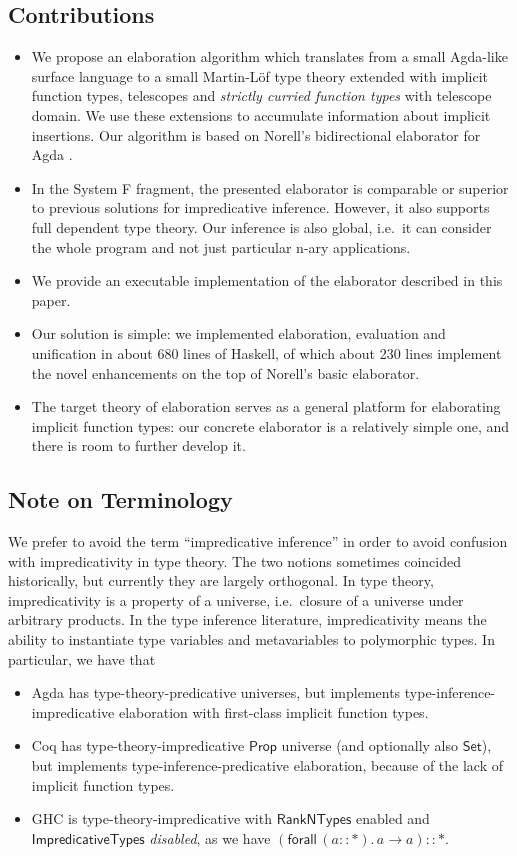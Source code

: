 \documentclass[acmsmall,screen,dvipsnames]{acmart}\settopmatter{}
\newcommand{\kw}[1]{{\mathsf{#1}}}
\theoremstyle{remark}
\begin{document}
\subsection{Contributions}
\begin{itemize}
  \item We propose an elaboration algorithm which translates from a small
    Agda-like surface language to a small Martin-L\"of type theory extended with
    implicit function types, telescopes and \emph{strictly curried function
      types} with telescope domain. We use these extensions to accumulate
    information about implicit insertions. Our algorithm is based on Norell's
    bidirectional elaborator for Agda \cite[Chapter~3]{norell07thesis}.
  \item
    In the System F fragment, the presented elaborator is comparable or superior
    to previous solutions for impredicative inference. However, it also supports
    full dependent type theory. Our inference is also global, i.e.\ it can
    consider the whole program and not just particular n-ary applications.
  \item We provide an executable implementation of the elaborator described in
    this paper.
  \item Our solution is simple: we implemented elaboration, evaluation and
    unification in about 680 lines of Haskell, of which about 230 lines
    implement the novel enhancements on the top of Norell's basic elaborator.
  \item The target theory of elaboration serves as a general platform for
    elaborating implicit function types: our concrete elaborator is a relatively
    simple one, and there is room to further develop it.
\end{itemize}

\subsection{Note on Terminology}

We prefer to avoid the term ``impredicative inference'' in order to avoid
confusion with impredicativity in type theory. The two notions sometimes
coincided historically, but currently they are largely orthogonal. In type
theory, impredicativity is a property of a universe, i.e.\ closure of a universe
under arbitrary products. In the type inference literature, impredicativity
means the ability to instantiate type variables and metavariables to polymorphic
types. In particular, we have that
\begin{itemize}
  \item Agda has type-theory-predicative universes, but implements
    type-inference-impredicative elaboration with first-class implicit function
    types.
  \item Coq has type-theory-impredicative $\kw{Prop}$ universe (and optionally
    also $\kw{Set}$), but implements type-inference-predicative elaboration,
    because of the lack of implicit function types.
  \item GHC is type-theory-impredicative with $\kw{RankNTypes}$ enabled and
    $\kw{ImpredicativeTypes}$ \emph{disabled}, as we have $(\kw{forall}\,(a :: *).\, a
    \to a) :: *$.
\end{itemize}
\end{document}
